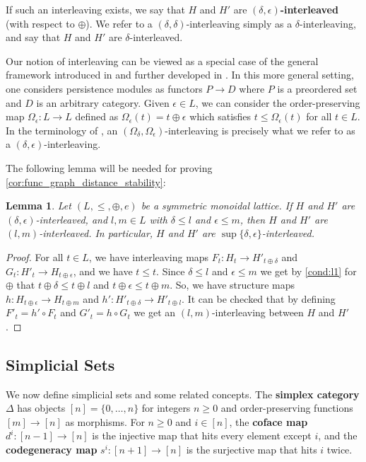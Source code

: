 \documentclass[a4paper,11pt]{article}
\newcommand{\atensor}{\oplus}
\newcounter{dummy}\numberwithin{dummy}{section}
\newtheorem{lemma}[dummy]{Lemma}
\theoremstyle{remark}
\begin{document}
If such an interleaving exists, we say that $H$ and $H'$ are \textbf{$(\delta, \epsilon)$-interleaved} (with respect to $\atensor$). We refer to a $(\delta,\delta)$-interleaving simply as a $\delta$-interleaving, and say that $H$ and $H'$ are $\delta$-interleaved.

Our notion of interleaving can be viewed as a special case of the general framework introduced in \cite{bubenik2015metrics} and further developed in \cite{de2017theory}. In this more general setting, one considers persistence modules as functors $P\to D$ where $P$ is a preordered set and $D$ is an arbitrary category. Given $\epsilon\in L$, we can consider the order-preserving map $\Omega_\epsilon\colon L\to L$ defined as $\Omega_\epsilon(t)=t\atensor\epsilon$ which satisfies $t\leq\Omega_\epsilon(t)$ for all $t\in L$. In the terminology of \cite{bubenik2015metrics}, an $(\Omega_\delta, \Omega_\epsilon)$-interleaving is precisely what we refer to as a $(\delta,\epsilon)$-interleaving.

The following lemma will be needed for proving \cref{cor:func_graph_distance_stability}:
\begin{lemma}\label{lem:max_interleaved}
    Let $(L, \leq, \atensor, e)$ be a symmetric monoidal lattice. If $H$ and $H'$ are $(\delta, \epsilon)$-interleaved, and $l,m\in L$ with $\delta\leq l$ and $\epsilon\leq m$, then $H$ and $H'$ are $(l,m)$-interleaved. In particular, $H$ and $H'$ are $\sup\{\delta, \epsilon\}$-interleaved.
\end{lemma}
\begin{proof}
For all $t\in L$, we have interleaving maps $F_t\colon H_t\to H'_{t\atensor\delta}$ and $G_t\colon H'_t\to H_{t\atensor\epsilon}$, and we have $t\leq t$. Since $\delta\leq l$ and $\epsilon\leq m$ we get by \ref{cond:l1} for $\atensor$ that $t\atensor\delta\leq t\atensor l$ and $t\atensor\epsilon\leq t\atensor m$. So, we have structure maps $h\colon H_{t\atensor\epsilon}\to H_{t\atensor m}$ and $h'\colon H'_{t\atensor\delta}\to H'_{t\atensor l}$. It can be checked that by defining $F'_t=h'\circ F_t$ and $G'_t=h\circ G_t$ we get an $(l,m)$-interleaving between $H$ and $H'$.
\end{proof}

\subsection{Simplicial Sets}\label{sec:simplicial_sets}
We now define simplicial sets and some related concepts. The \textbf{simplex category} $\Delta$ has objects $[n]=\{0,\dots,n\}$ for integers $n\geq 0$ and order-preserving functions $[m]\to[n]$ as morphisms. For $n\geq0$ and $i\in[n]$, the \textbf{coface map} $d^i\colon [n-1]\to[n]$ is the injective map that hits every element except $i$, and the \textbf{codegeneracy map} $s^i\colon [n+1]\to[n]$ is the surjective map that hits $i$ twice.
\end{document}
